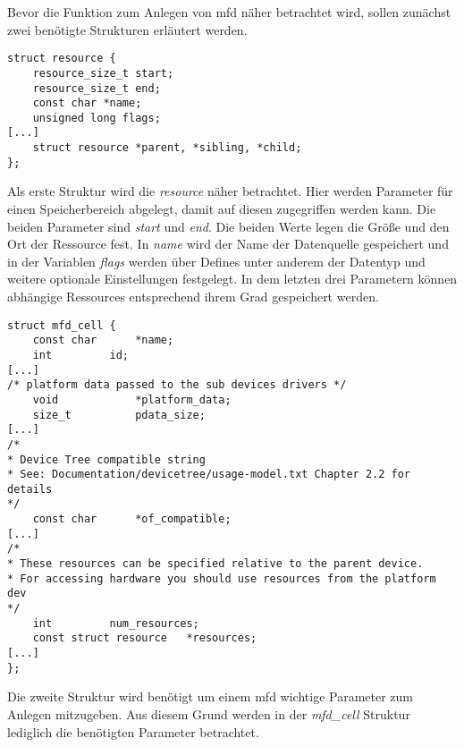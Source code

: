 Bevor die Funktion zum Anlegen von \ac{mfd} näher betrachtet wird, sollen zunächst zwei benötigte Strukturen erläutert werden.

\begin{lstfloat}
\begin{lstlisting}
struct resource {
	resource_size_t start;
	resource_size_t end;
	const char *name;
	unsigned long flags;
[...]
	struct resource *parent, *sibling, *child;
};
\end{lstlisting}
\end{lstfloat}

Als erste Struktur wird die \textit{resource} näher betrachtet. Hier werden Parameter für einen Speicherbereich abgelegt, damit auf diesen zugegriffen werden kann. 
Die beiden Parameter sind \textit{start} und \textit{end}. Die beiden Werte legen die Größe und den Ort der Ressource fest. 
In \textit{name} wird der Name der Datenquelle gespeichert und in der Variablen \textit{flags} werden über Defines unter anderem der Datentyp und weitere optionale Einstellungen festgelegt.
In dem letzten drei Parametern können abhängige Ressources entsprechend ihrem Grad gespeichert werden. \\

\begin{lstfloat}
\begin{lstlisting}
struct mfd_cell {
	const char		*name;
	int			id;
[...]
/* platform data passed to the sub devices drivers */
	void			*platform_data;
	size_t			pdata_size;	
[...]	
/*
* Device Tree compatible string
* See: Documentation/devicetree/usage-model.txt Chapter 2.2 for details
*/
	const char		*of_compatible;	
[...]	
/*
* These resources can be specified relative to the parent device.
* For accessing hardware you should use resources from the platform dev
*/
	int			num_resources;
	const struct resource	*resources;	
[...]
};
\end{lstlisting}
\end{lstfloat}

Die zweite Struktur wird benötigt um einem \ac{mfd} wichtige Parameter zum Anlegen mitzugeben. Aus diesem Grund werden in der \textit{mfd\_cell} Struktur lediglich die benötigten Parameter betrachtet. 

